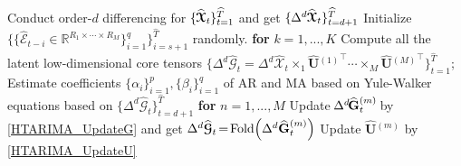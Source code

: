 \documentclass[letterpaper]{article} %
\numberwithin{theorem}{section}
\newcommand{\ten}[1]{ \boldsymbol{\mathcal #1}}
\newcommand{\bbR}[1]{\mathbb{R}^{#1}}
\begin{document}
\begin{algorithm}[ttt!]
\begin{algorithmic}[1]
		\STATE Conduct order-$d$ differencing  for  $\hspace{-0.01cm} \{\hspace{-0.01cm}{\widehat{\ten{X}}_t}\hspace{-0.01cm}\}_{t=1}^{\widehat{T}}\hspace{-0.01cm}$ and get  $ \{\hspace{-0.01cm}\Delta^d\hspace{-0.01cm} {\widehat{\ten{X}}_t}\}_{t=d+1}^{\widehat{T}}\hspace{-0.01cm}$
		\STATE Initialize  $\{\{\widehat{\ten{E}}_{{t-i}} \in \bbR{R_1 \times \cdots \times R_M} \}_{i=1}^q\}_{i=s+1}^{\widehat{T}}$ randomly.
		\STATE\textbf{for}  {$k = 1, ...,K$}
		\STATE \quad Compute all the latent low-dimensional core tensors  \quad  $ \{ \Delta^d {\widehat{\ten{G}}_t}    = \Delta^d {\widehat{\ten{X}}_t}  \times_1  \widehat{\mathbf U}{^{(1)}}^\top   \cdots \times_M  \widehat{\mathbf U}{^{(M)}}^\top\}_{t=1}^{\widehat{T}}$;
		\STATE  \quad  Estimate coefficients  $ \{\alpha_i \}_{i=1}^p,  \{\beta_i \}_{i=1}^q $  of  AR and MA  \hspace{0.5cm} based on Yule-Walker equations based on $ \{\Delta^d {\widehat{\ten{G}}_t}\}_{t=d+1}^{\widehat{T}}$
		\STATE \quad \textbf{for} $n = 1, ...,M$
		\STATE	\quad \quad   Update $ \hspace{-0.05cm} \Delta^d\hspace{-0.05cm}  {\widehat{\mathbf{G}}^{(m)}_{t}}\hspace{-0.05cm}$  by \eqref{HTARIMA_UpdateG} and get $\Delta^d {\widehat{\ten{G}}_{t}} \hspace{-0.05cm}=\hspace{-0.05cm}  \text{Fold} \Big
		(\Delta^d{\widehat{\mathbf{G}}^{(m)}_{t}}\Big)  $
		\STATE	\quad \quad   Update $\widehat{ \mathbf U}{^{(m)}}$ by \eqref{HTARIMA_UpdateU}


\end{algorithmic}
\end{algorithm}
\end{document}
